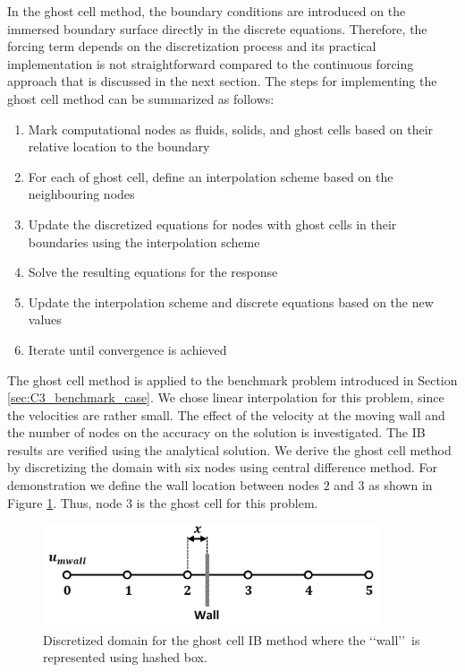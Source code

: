 In the ghost cell method, the boundary conditions are introduced on the immersed boundary surface directly in the discrete equations. Therefore, the forcing term depends on the discretization process and its practical implementation is not straightforward compared to the continuous forcing approach that is discussed in the next section. The steps for implementing the ghost cell method can be summarized as follows:
%
\begin{enumerate}
    \item Mark computational nodes as fluids, solids, and ghost cells based on their relative location to the boundary
    \item For each of ghost cell, define an interpolation scheme based on the neighbouring nodes
    \item Update the discretized equations for nodes with ghost cells in their boundaries using the interpolation scheme
    \item Solve the resulting equations for the response
    \item Update the interpolation scheme and discrete equations based on the new values
    \item Iterate until convergence is achieved
\end{enumerate}
%
The ghost cell method is applied to the benchmark problem introduced in Section \ref{sec:C3_benchmark_case}. We chose linear interpolation for this problem, since the velocities are rather small. The effect of the velocity at the moving wall and the number of nodes on the accuracy on the solution is investigated. The IB results are verified using the analytical solution. We derive the ghost cell method by discretizing the domain with six nodes using central difference method. For demonstration we define the wall location between nodes $2$ and $3$ as shown in Figure \ref{fig:C3_discretizedGhostCell}. Thus, node $3$ is the ghost cell for this problem.
%
\begin{figure}[H]
    \centering
    \includegraphics[width=10.00cm]{Chapter_3/figure/ghost_cell_discretization.png}
    \caption{Discretized domain for the ghost cell IB method where the \lq\lq wall\rq\rq\ is represented using hashed box.}
    \label{fig:C3_discretizedGhostCell}
\end{figure}
